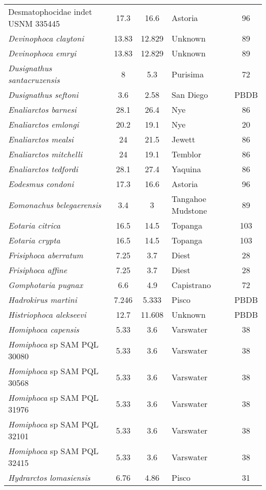 \begin{longtable}{p{}cclc}
Desmatophocidae indet USNM 335445 & 	17.3	&	16.6	&	Astoria	&96\\
\textit{Devinophoca claytoni} & 	13.83	&	12.829	&	Unknown	&89\\
\textit{Devinophoca emryi} & 	13.83	&	12.829	&	Unknown	&89\\
\textit{Dusignathus santacruzensis} & 	8	&	5.3	&	Purisima	&72\\
\textit{Dusignathus seftoni} & 	3.6	&	2.58	&	San Diego	&PBDB\\
\textit{Enaliarctos barnesi} & 	28.1	&	26.4	&	Nye	&86\\
\textit{Enaliarctos emlongi} & 	20.2	&	19.1	&	Nye	&20\\
\textit{Enaliarctos mealsi} & 	24	&	21.5	&	Jewett	&86\\
\textit{Enaliarctos mitchelli} & 	24	&	19.1	&	Temblor	&86\\
\textit{Enaliarctos tedfordi} & 	28.1	&	27.4	&	Yaquina	&86\\
\textit{Eodesmus condoni} & 	17.3	&	16.6	&	Astoria	&96\\
\textit{Eomonachus belegaerensis} & 	3.4	&	3	&	Tangahoe Mudstone	&89\\
\textit{Eotaria citrica} & 	16.5	&	14.5	&	Topanga	&103\\
\textit{Eotaria crypta} & 	16.5	&	14.5	&	Topanga	&103\\
\textit{Frisiphoca aberratum} & 	7.25	&	3.7	&	Diest	&28\\
\textit{Frisiphoca affine} & 	7.25	&	3.7	&	Diest	&28\\
\textit{Gomphotaria pugnax} & 	6.6	&	4.9	&	Capistrano	&72\\
\textit{Hadrokirus martini} & 	7.246	&	5.333	&	Pisco	&PBDB\\
\textit{Histriophoca alekseevi} & 	12.7	&	11.608	&	Unknown	&PBDB\\
\textit{Homiphoca capensis} & 	5.33	&	3.6	&	Varswater	&38\\
\textit{Homiphoca} sp SAM PQL 30080 & 	5.33	&	3.6	&	Varswater	&38\\
\textit{Homiphoca} sp SAM PQL 30568 & 	5.33	&	3.6	&	Varswater	&38\\
\textit{Homiphoca} sp SAM PQL 31976 & 	5.33	&	3.6	&	Varswater	&38\\
\textit{Homiphoca} sp SAM PQL 32101 & 	5.33	&	3.6	&	Varswater	&38\\
\textit{Homiphoca} sp SAM PQL 32415 & 	5.33	&	3.6	&	Varswater	&38\\
\textit{Hydrarctos lomasiensis} & 	6.76	&	4.86	&	Pisco	&31\\

\end{longtable}
